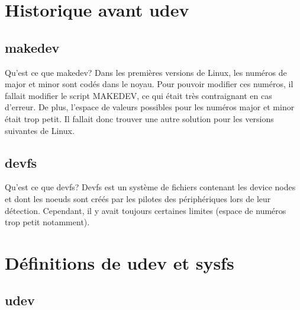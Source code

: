 \documentclass{beamer}
\begin{document}
\section{Historique avant udev}

\subsection{makedev}
\begin{frame}
\begin{block}{Qu'est ce que makedev?} 
	Dans les premières versions de Linux, les numéros de major et minor sont codés dans le noyau. Pour pouvoir modifier ces numéros, il fallait modifier le script MAKEDEV, ce qui était très contraignant en cas d'erreur. De plus, l'espace de valeurs possibles pour les numéros major et minor était trop petit. 
	Il fallait donc trouver une autre solution pour les versions suivantes de Linux.
\end{block}
\end{frame}

\subsection{devfs}
\begin{frame}
\begin{block}{Qu'est ce que devfs?} 
	Devfs est un système de fichiers contenant les device nodes et dont les noeuds sont créés par les pilotes des périphériques lors de leur détection. Cependant, il y avait toujours certaines limites (espace de numéros trop petit notamment).
\end{block}
\end{frame}

\section{Définitions de udev et sysfs}

\subsection{udev}
\end{document}
